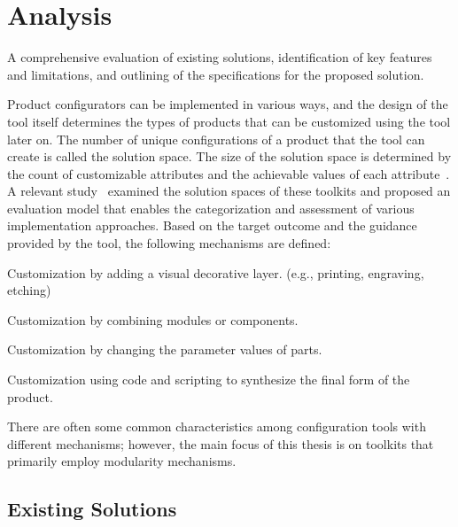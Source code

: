 \chapter{Analysis}

\begin{chapterabstract}
A comprehensive evaluation of existing solutions, identification of key features and limitations, and outlining of the specifications for the proposed solution.
\end{chapterabstract}

Product configurators can be implemented in various ways, and the design of the tool itself determines the types of products that can be customized using the tool later on. The number of unique configurations of a product that the tool can create is called the solution space. The size of the solution space is determined by the count of customizable attributes and the achievable values of each attribute~\cite{Huiwen2018}. A relevant study~\cite{Hermans2012} examined the solution spaces of these toolkits and proposed an evaluation model that enables the categorization and assessment of various implementation approaches. Based on the target outcome and the guidance provided by the tool, the following mechanisms are defined:

\begin{definition}[Veneer]
Customization by adding a visual decorative layer. (e.g., printing, engraving, etching)
\end{definition}
\begin{definition}[Modularity]
Customization by combining modules or components.
\end{definition}
\begin{definition}[Parametric]
Customization by changing the parameter values of parts.
\end{definition}
\begin{definition}[Generative]
Customization using code and scripting to synthesize the final form of the product.
\end{definition}

There are often some common characteristics among configuration tools with different mechanisms; however, the main focus of this thesis is on toolkits that primarily employ modularity mechanisms.
\newpage

\section{Existing Solutions}

